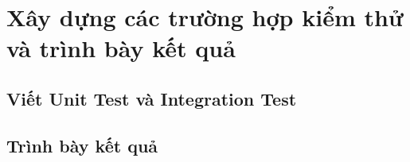 
\chapter{Xây dựng các trường hợp kiểm thử và trình bày kết quả}

\section{Viết Unit Test và Integration Test}
\section{Trình bày kết quả}